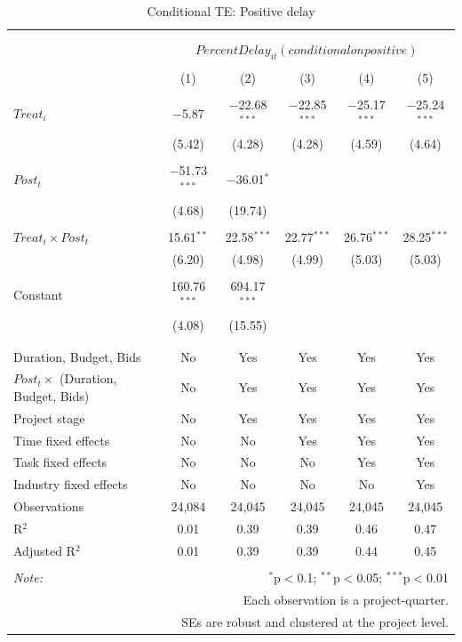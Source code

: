 \documentclass[
]{article}
\begin{document}
\begin{table}[H] \centering 
  \caption{Conditional TE: Positive delay} 
  \label{} 
\small 
\begin{tabular}{@{\extracolsep{-2pt}}lccccc} 
\\[-1.8ex]\hline 
\hline \\[-1.8ex] 
\\[-1.8ex] & \multicolumn{5}{c}{$PercentDelay_{it} (conditional on positive)$} \\ 
\\[-1.8ex] & (1) & (2) & (3) & (4) & (5)\\ 
\hline \\[-1.8ex] 
 $Treat_i$ & $-$5.87 & $-$22.68$^{***}$ & $-$22.85$^{***}$ & $-$25.17$^{***}$ & $-$25.24$^{***}$ \\ 
  & (5.42) & (4.28) & (4.28) & (4.59) & (4.64) \\ 
  & & & & & \\ 
 $Post_t$ & $-$51.73$^{***}$ & $-$36.01$^{*}$ &  &  &  \\ 
  & (4.68) & (19.74) &  &  &  \\ 
  & & & & & \\ 
 $Treat_i \times Post_t$ & 15.61$^{**}$ & 22.58$^{***}$ & 22.77$^{***}$ & 26.76$^{***}$ & 28.25$^{***}$ \\ 
  & (6.20) & (4.98) & (4.99) & (5.03) & (5.03) \\ 
  & & & & & \\ 
 Constant & 160.76$^{***}$ & 694.17$^{***}$ &  &  &  \\ 
  & (4.08) & (15.55) &  &  &  \\ 
  & & & & & \\ 
\hline \\[-1.8ex] 
Duration, Budget, Bids & No & Yes & Yes & Yes & Yes \\ 
$Post_t \times$  (Duration, Budget, Bids) & No & Yes & Yes & Yes & Yes \\ 
Project stage & No & Yes & Yes & Yes & Yes \\ 
Time fixed effects & No & No & Yes & Yes & Yes \\ 
Task fixed effects & No & No & No & Yes & Yes \\ 
Industry fixed effects & No & No & No & No & Yes \\ 
Observations & 24,084 & 24,045 & 24,045 & 24,045 & 24,045 \\ 
R$^{2}$ & 0.01 & 0.39 & 0.39 & 0.46 & 0.47 \\ 
Adjusted R$^{2}$ & 0.01 & 0.39 & 0.39 & 0.44 & 0.45 \\ 
\hline 
\hline \\[-1.8ex] 
\textit{Note:}  & \multicolumn{5}{r}{$^{*}$p$<$0.1; $^{**}$p$<$0.05; $^{***}$p$<$0.01} \\ 
 & \multicolumn{5}{r}{Each observation is a project-quarter.} \\ 
 & \multicolumn{5}{r}{SEs are robust and clustered at the project level.} \\ 
\end{tabular} 
\end{table}
\end{document}
